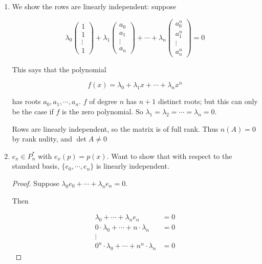 \documentclass[a4paper]{article}
\begin{document}
\begin{enumerate}[label = (\alph*)]
	\item We show the rows are linearly independent: suppose
	
	\[ \lambda_{0} \begin{pmatrix}
	1 \\
	1 \\
	\vdots \\
	1
	\end{pmatrix} + 
	\lambda_{1} \begin{pmatrix}
	a_{0}\\
	a_{1} \\
	\vdots\\
	a_{n}
	\end{pmatrix} + \cdots + 
	\lambda_{n} \begin{pmatrix}
	a_{0}^{n}\\
	a_{1}^{n} \\
	\vdots\\
	a_{n}^{n}
	\end{pmatrix} = 0 \]
	
	This says that the polynomial 
	
	\[ f(x) = \lambda_{0} + \lambda_{1} x + \cdots + \lambda_{n} x^{n} \]
	
	has roots $ a_{0},a_{1},\cdots,a_{n} $. $ f $ of degree $ n $ has $ n+1 $ distinct roots; but this can only be the case if $ f $ is the zero polynomial. So $ \lambda_{1} = \lambda_{2} = \cdots = \lambda_{n} = 0 $.
	
	
	Rows are linearly independent, so the matrix is of full rank. Thus $ n(A) = 0 $ by rank nulity, and $ \det A \neq 0 $
	
	\item $ e_{x} \in P_{n}^{*} $ with $ e_{x}(p) = p(x) $. Want to show that with respect to the standard basis, $ \{ e_{0},\cdots,e_{n} \} $ is linearly independent.
	
	\begin{proof}
		Suppose $ \lambda_{0} e_{0} + \cdots + \lambda_{n} e_{n} = 0 $.
		
		Then
		
		\begin{align*}
		\lambda_{0} + \cdots + \lambda_{n} e_{n} & = 0 \\
		0 \cdot \lambda_{0} + \cdots + n \cdot \lambda_{n} & = 0 \\
		\vdots \\
		0^{n} \cdot \lambda_{0} + \cdots + n^{n} \cdot \lambda_{n} & = 0
		 \end{align*}
		 

\end{proof}
\end{enumerate}
\end{document}

